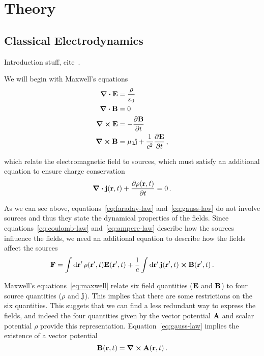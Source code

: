\documentclass[../thesis.tex]{subfiles}
\begin{document}
\chapter{Theory}
\label{chap:Theory}

\section{Classical Electrodynamics}

{\color{red} Introduction stuff, cite~\textcite{eisenberg_nuclear_1978}}.

We will begin with Maxwell's equations
\begin{subequations}
  \label{eq:maxwell}
  \begin{align}
    \div{\vb{E}} & = \frac{\rho}{\varepsilon_0} \label{eq:coulomb-law} \\
    \div{\vb{B}} & = 0 \label{eq:gauss-law} \\
    \curl{\vb{E}} & = - \pdv{\vb{B}}{t} \label{eq:faraday-law} \\
    \curl{\vb{B}} & = \mu_0 \vb{j} + \frac{1}{c^2} \pdv{\vb{E}}{t} \,, \label{eq:ampere-law}
  \end{align}
\end{subequations}

which relate the electromagnetic field to sources, which must satisfy an additional
equation to ensure charge conservation
\[
  \div{\vb{j}(\vb{r}, t)} + \pdv{\rho(\vb{r}, t)}{t} = 0 \,.
\]

As we can see above, equations~\eqref{eq:faraday-law} and~\eqref{eq:gauss-law}
do not involve sources and thus they state the dynamical properties of the fields.
Since equations~\eqref{eq:coulomb-law} and~\eqref{eq:ampere-law} describe how
the sources influence the fields, we need an additional equation to describe how
the fields affect the sources
\[
  \vb{F} = \int \dd{\vb{r}'} \rho(\vb{r}', t) \vb{E}(\vb{r}', t) +
           \frac{1}{c} \int \dd{\vb{r}'} \vb{j}(\vb{r}', t) \cross \vb{B}(\vb{r}', t)\,.
\]

Maxwell's equations~\eqref{eq:maxwell} relate six field quantities (\(\vb{E}\) and \(\vb{B}\))
to four source quantities (\(\rho\) and \(\vb{j}\)). This implies that there are some
restrictions on the six quantities. This suggets that we can find a less redundant
way to express the fields, and indeed the four quantities given by the
vector potential \(\vb{A}\) and scalar potential \(\rho\) provide this representation.
Equation~\eqref{eq:gauss-law} implies the existence of a vector potential
\begin{equation}
  \label{eq:vector-potential}
  \vb{B}(\vb{r}, t) = \curl{\vb{A}(\vb{r}, t)}\,.
\end{equation}
\end{document}
